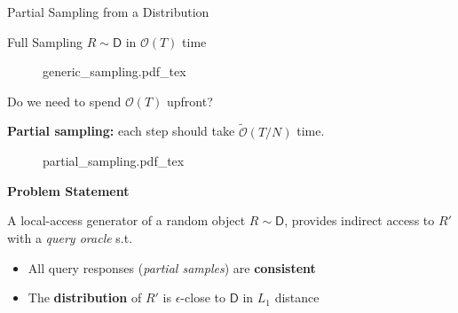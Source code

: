 \begin{block}{Partial Sampling from a Distribution}



\begin{alertblock}{Full Sampling $R \sim\mathsf D$ in $\mathcal O (T)$ time}

\begin{figure}[h!]\centering
    \def\svgwidth{0.5\columnwidth}
    {generic_sampling.pdf_tex}
\end{figure}

\end{alertblock}


\begin{alertblock}{Do we need to spend $\mathcal{O}(T)$ upfront?}

\begin{center}
\textbf{Partial sampling:} each step should take $\tilde{\mathcal O} (T/N)$ time.
\end{center}

\begin{figure}[h!]\centering
    \def\svgwidth{0.7\columnwidth}
    {partial_sampling.pdf_tex}
\end{figure}

\end{alertblock}


\begin{alertblock}{\textbf{Problem Statement}}

A local-access generator of a random object $R \sim\mathsf D$,
provides indirect access to $R'$ with a \emph{query oracle} s.t.
\begin{itemize}
    \item All query responses (\emph{partial samples}) are \textbf{consistent}
    \item The \textbf{distribution} of $R'$ is $\epsilon$-close to $\mathsf D$ in $L_1$ distance
\end{itemize}

\end{alertblock}



\end{block}

